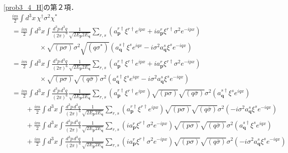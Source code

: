 \eqref{prob3_4_H}の第２項．
\begin{align*}
  & \frac{im}{2}\int d^3x \, \chi^\dagger \sigma^2 \chi^\ast \\
  & = \frac{im}{2}\int d^3x \int \frac{d^3p\, d^3q}{(2\pi)^6} \frac{1}{\sqrt{2E_{\boldsymbol{p}}2E_{\boldsymbol{q}}}}
  \sum_{r, s} \left( a_{\boldsymbol{p}}^{r\dagger} \xi^{r\dagger} e^{ipx} + i a_{\boldsymbol{p}}^{r} \xi^{r\dagger} \sigma^2 e^{-ipx} \right) \\
  & \qquad \qquad \times \sqrt{(p \sigma)} \sigma^2 \sqrt{(q\sigma^\ast)} \left( a_{\boldsymbol{q}}^{s\dagger} \xi^s e^{iqx} - i \sigma^2 a_{\boldsymbol{q}}^{s} \xi^s e^{-iqx} \right) \\
  & = \frac{im}{2}\int d^3x \int \frac{d^3p\, d^3q}{(2\pi)^6} \frac{1}{\sqrt{2E_{\boldsymbol{p}}2E_{\boldsymbol{q}}}}
  \sum_{r, s} \left( a_{\boldsymbol{p}}^{r\dagger} \xi^{r\dagger} e^{ipx} + i a_{\boldsymbol{p}}^{r} \xi^{r\dagger} \sigma^2 e^{-ipx} \right) \\
  & \qquad \qquad \times \sqrt{(p \sigma)} \sqrt{(q\bar\sigma)} \sigma^2 \left( a_{\boldsymbol{q}}^{s\dagger} \xi^s e^{iqx} - i \sigma^2 a_{\boldsymbol{q}}^{s} \xi^s e^{-iqx} \right) \\
  & = \frac{im}{2}\int d^3x \int \frac{d^3p\, d^3q}{(2\pi)^6} \frac{1}{\sqrt{2E_{\boldsymbol{p}}2E_{\boldsymbol{q}}}}
  \sum_{r, s} \left( a_{\boldsymbol{p}}^{r\dagger} \xi^{r\dagger} e^{ipx} \right) \sqrt{(p \sigma)} \sqrt{(q \bar\sigma)} \sigma^2 \left( a_{\boldsymbol{q}}^{s\dagger} \xi^s e^{iqx} \right) \\
  & \qquad + \frac{im}{2}\int d^3x \int \frac{d^3p\, d^3q}{(2\pi)^6} \frac{1}{\sqrt{2E_{\boldsymbol{p}}2E_{\boldsymbol{q}}}}
  \sum_{r, s} \left( a_{\boldsymbol{p}}^{r\dagger} \xi^{r\dagger} e^{ipx} \right) \sqrt{(p \sigma)} \sqrt{(q \bar\sigma)} \sigma^2 \left( - i \sigma^2 a_{\boldsymbol{q}}^{s} \xi^s e^{-iqx} \right) \\
  & \qquad + \frac{im}{2}\int d^3x \int \frac{d^3p\, d^3q}{(2\pi)^6} \frac{1}{\sqrt{2E_{\boldsymbol{p}}2E_{\boldsymbol{q}}}}
  \sum_{r, s} \left( i a_{\boldsymbol{p}}^{r} \xi^{r\dagger} \sigma^2 e^{-ipx} \right) \sqrt{(p \sigma)} \sqrt{(q \bar\sigma)} \sigma^2 \left( a_{\boldsymbol{q}}^{s\dagger} \xi^s e^{iqx} \right) \\
  & \qquad + \frac{im}{2}\int d^3x \int \frac{d^3p\, d^3q}{(2\pi)^6} \frac{1}{\sqrt{2E_{\boldsymbol{p}}2E_{\boldsymbol{q}}}}
  \sum_{r, s} \left( i a_{\boldsymbol{p}}^{r} \xi^{r\dagger} \sigma^2 e^{-ipx} \right) \sqrt{(p \sigma)} \sqrt{(q \bar\sigma)} \sigma^2 \left( - i \sigma^2 a_{\boldsymbol{q}}^{s} \xi^s e^{-iqx} \right) \\

\end{align*}
